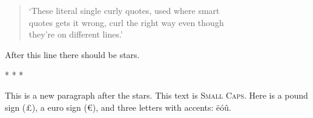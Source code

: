 \documentclass[
  12pt,
  british,
  a4paper,
]{article}
\newif\iffootnote
\let\OldRule\rule
\renewcommand{\rule}[2]{\iffootnote\OldRule{#1}{#2}\else* * *\fi}
\begin{document}
\begin{quote}
`These literal single curly quotes, used where smart\\
quotes gets it wrong, curl the right way even though\\
they're on different lines.'
\end{quote}

After this line there should be stars.

\begin{center}\rule{0.5\linewidth}{0.5pt}\end{center}

This is a new paragraph after the stars. This text is \textsc{Small
Caps}. Here is a pound sign (£), a euro sign (€), and three letters with
accents: ëóû.
\end{document}
